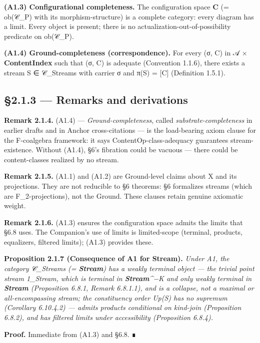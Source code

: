 \documentclass[11pt, openany]{book}
\begin{document}
\textbf{(A1.3) Configurational completeness.} The configuration space \textbf{C} (= ob(𝒞\_\allowbreak{}P) with its morphism-structure) is a complete category: every diagram has a limit. Every object is present; there is no actualization-out-of-possibility predicate on ob(𝒞\_\allowbreak{}P).

\textbf{(A1.4) Ground-completeness (correspondence).} For every (σ, C) in 𝒜 × \textbf{ContentIndex} such that (σ, C) is adequate (Convention 1.1.6), there exists a stream S ∈ 𝒞\_\allowbreak{}Streams with carrier σ and π(S) = [C] (Definition 1.5.1).

\subsection{§2.1.3 --- Remarks and derivations}

\textbf{Remark 2.1.4.} (A1.4) --- \textit{Ground-completeness}, called \textit{substrate-completeness} in earlier drafts and in Anchor cross-citations --- is the load-bearing axiom clause for the F-coalgebra framework: it says ContentOp-class-adequacy guarantees stream-existence. Without (A1.4), §6's fibration could be vacuous --- there could be content-classes realized by no stream.

\textbf{Remark 2.1.5.} (A1.1) and (A1.2) are Ground-level claims about X and its projections. They are not reducible to §6 theorems: §6 formalizes streams (which are F\_\allowbreak{}2-projections), not the Ground. These clauses retain genuine axiomatic weight.

\textbf{Remark 2.1.6.} (A1.3) ensures the configuration space admits the limits that §6.8 uses. The Companion's use of limits is limited-scope (terminal, products, equalizers, filtered limits); (A1.3) provides these.

\textbf{Proposition 2.1.7 (Consequence of A1 for Stream).} \textit{Under A1, the category 𝒞\_\allowbreak{}Streams (= \textbf{Stream}) has a weakly terminal object --- the trivial point stream 1\_\allowbreak{}Stream, which is terminal in \textbf{Stream}\textasciicircum{}{−K} and only weakly terminal in \textbf{Stream} (Proposition 6.8.1, Remark 6.8.1.1), and is a collapse, not a maximal or all-encompassing stream; the constituency order Up(S) has no supremum (Corollary 6.10.4.2) --- admits products conditional on kind-join (Proposition 6.8.2), and has filtered limits under accessibility (Proposition 6.8.4).}

\textbf{Proof.} Immediate from (A1.3) and §6.8. ∎
\end{document}
